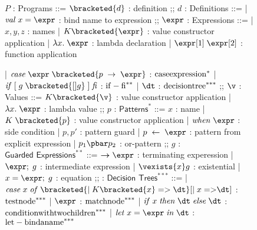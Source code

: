 \documentclass[manuscript,screen,review, 12pt]{acmart}
\begin{document}
\begin{figure}[h!p]
    \small
    \begin{flushleft}
        \begin{bnf}
        $P$ : \textsf{Programs} ::=
        $\bracketed{d}$ : definition
        ;;
        $d$ : \textsf{Definitions} ::=
        | $\mathit{val}\; x\; \mathit{=}\; \expr$ : bind name to expression
        ;;
        $\expr$ : Expressions ::= 
        | $x, y, z$             : names
        | $K\bracketed{\expr}$  : value constructor application 
        | $\lambda x.\; \expr$  : lambda declaration  
        | $\expr[1]\; \expr[2]$ : function application 
    
        | $\mathit{case}\; \expr\; \bracketed{p\; \rightarrow\; \expr}$ : $\rm{case expression}^{*}$
        | $\mathit{if}\; \mathit{[}\; g\; 
            \bracketed{[] g}\; \mathit{]}\; \mathit{fi}$                : $\rm{if-fi}^{**}$
        | $\dt$                                                         : $\rm{decision tree}^{***}$
        ;;
        $\v$ : Values ::= 
          $K\bracketed{\v}$     : value constructor application 
        | $\lambda x.\; \expr$  : lambda value 
        ;;
        $p$ : $\textsf{Patterns}^{*}$ ::= 
        $x$ : name 
        | $K\; \bracketed{p}$           : value constructor application 
        | $\mathit{when}\; \expr$       : side condition
        | $p, p'$                       : pattern guard 
        | $p\; \leftarrow\; \expr$      : pattern from explicit expression  
        | $p_{1}\pbar p_{2}$            : or-pattern
        ;;
        $g$ : $\textsf{Guarded Expressions}^{**}$ ::=  
        $\boldsymbol{\rightarrow}\expr$ : terminating experession
        | $\expr;\; g$                  : intermediate expression 
        | $\vexists{x} g$      : existential 
        | $x = \expr;\; g$              : equation 
        ;;
        \dt : $\textsf{Decision Trees}^{***}$ ::= 
        | $\mathit{case}\; x\; \mathit{of}\; 
            \bracketed{\vert\; K\bracketed{x}\; \mathit{=>}\; \dt} 
            [\vert\; x\; \mathit{=>} \dt]$                              : $\rm{test node }^{***}$
        | $\expr$                                                       : $\rm{match node }^{***}$
        | $\mathit{if}\; x\; \mathit{then}\; \dt\; \mathit{else}\; \dt$ : $\rm{condition with two children }^{***}$
        | $\mathit{let}\; x\; \mathit{=}\; \expr\; \mathit{in}\; \dt$   : $\rm{let-bind a name}^{***}$
        \end{bnf}
        \medskip
        

\end{flushleft}
\end{figure}
\end{document}
